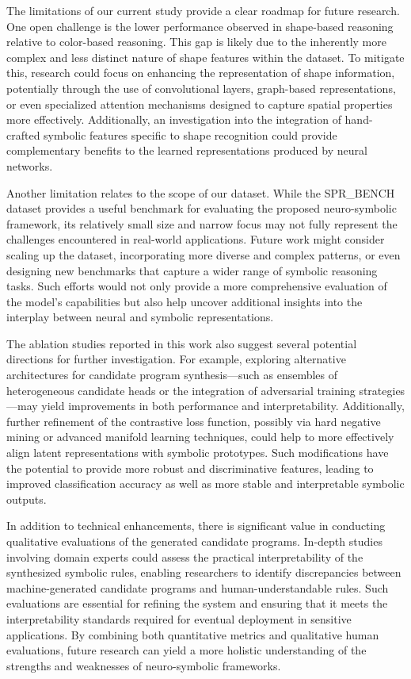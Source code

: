 \documentclass[11pt]{article}
\begin{document}
The limitations of our current study provide a clear roadmap for future research. One open challenge is the lower performance observed in shape-based reasoning relative to color-based reasoning. This gap is likely due to the inherently more complex and less distinct nature of shape features within the dataset. To mitigate this, research could focus on enhancing the representation of shape information, potentially through the use of convolutional layers, graph-based representations, or even specialized attention mechanisms designed to capture spatial properties more effectively. Additionally, an investigation into the integration of hand-crafted symbolic features specific to shape recognition could provide complementary benefits to the learned representations produced by neural networks.

Another limitation relates to the scope of our dataset. While the SPR\_BENCH dataset provides a useful benchmark for evaluating the proposed neuro-symbolic framework, its relatively small size and narrow focus may not fully represent the challenges encountered in real-world applications. Future work might consider scaling up the dataset, incorporating more diverse and complex patterns, or even designing new benchmarks that capture a wider range of symbolic reasoning tasks. Such efforts would not only provide a more comprehensive evaluation of the model’s capabilities but also help uncover additional insights into the interplay between neural and symbolic representations.

The ablation studies reported in this work also suggest several potential directions for further investigation. For example, exploring alternative architectures for candidate program synthesis—such as ensembles of heterogeneous candidate heads or the integration of adversarial training strategies—may yield improvements in both performance and interpretability. Additionally, further refinement of the contrastive loss function, possibly via hard negative mining or advanced manifold learning techniques, could help to more effectively align latent representations with symbolic prototypes. Such modifications have the potential to provide more robust and discriminative features, leading to improved classification accuracy as well as more stable and interpretable symbolic outputs.

In addition to technical enhancements, there is significant value in conducting qualitative evaluations of the generated candidate programs. In-depth studies involving domain experts could assess the practical interpretability of the synthesized symbolic rules, enabling researchers to identify discrepancies between machine-generated candidate programs and human-understandable rules. Such evaluations are essential for refining the system and ensuring that it meets the interpretability standards required for eventual deployment in sensitive applications. By combining both quantitative metrics and qualitative human evaluations, future research can yield a more holistic understanding of the strengths and weaknesses of neuro-symbolic frameworks.
\end{document}
